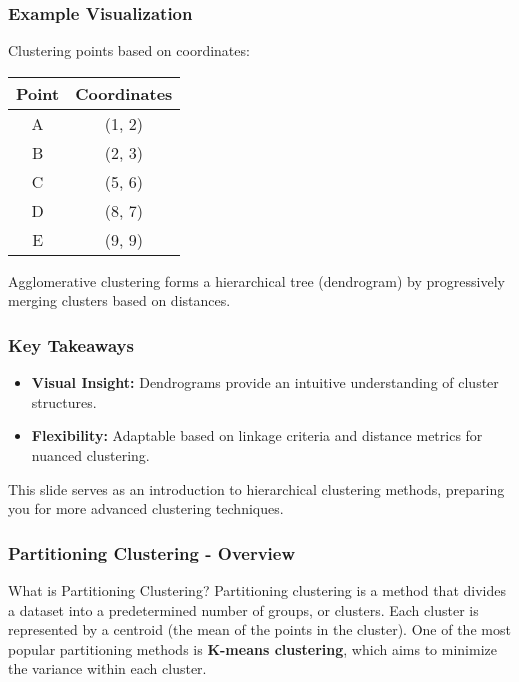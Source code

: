 \documentclass{beamer}
\begin{document}
\begin{frame}[fragile]
    \frametitle{Example Visualization}
    Clustering points based on coordinates:

    \begin{tabular}{|c|c|}
        \hline
        \textbf{Point} & \textbf{Coordinates} \\
        \hline
        A & (1, 2) \\
        B & (2, 3) \\
        C & (5, 6) \\
        D & (8, 7) \\
        E & (9, 9) \\
        \hline
    \end{tabular}

    Agglomerative clustering forms a hierarchical tree (dendrogram) by progressively merging clusters based on distances.
\end{frame}

\begin{frame}[fragile]
    \frametitle{Key Takeaways}
    \begin{itemize}
        \item \textbf{Visual Insight:} Dendrograms provide an intuitive understanding of cluster structures.
        \item \textbf{Flexibility:} Adaptable based on linkage criteria and distance metrics for nuanced clustering.
    \end{itemize}

    This slide serves as an introduction to hierarchical clustering methods, preparing you for more advanced clustering techniques.
\end{frame}

\begin{frame}[fragile]
    \frametitle{Partitioning Clustering - Overview}
    \begin{block}{What is Partitioning Clustering?}
        Partitioning clustering is a method that divides a dataset into a predetermined number of groups, or clusters. Each cluster is represented by a centroid (the mean of the points in the cluster). One of the most popular partitioning methods is \textbf{K-means clustering}, which aims to minimize the variance within each cluster.
    \end{block}
\end{frame}
\end{document}
